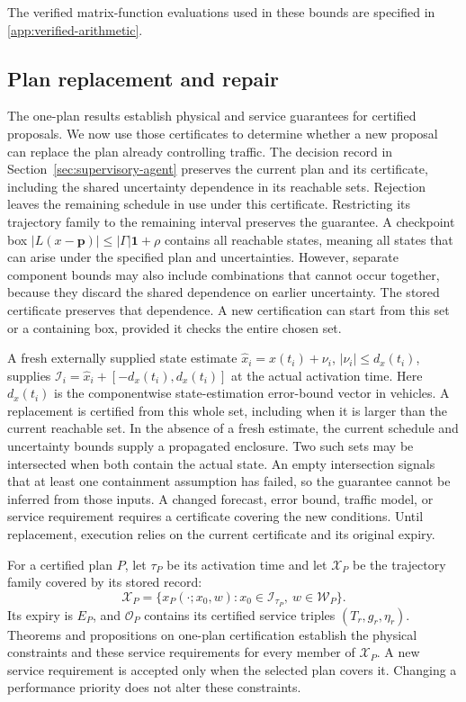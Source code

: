 \documentclass[preprint,12pt]{elsarticle}
\theoremstyle{definition}
\theoremstyle{plain}
\theoremstyle{definition}
\theoremstyle{plain}
\newcommand{\appref}[1]{\ref{#1}}
\begin{document}
The verified matrix-function evaluations used in these bounds are
specified in \appref{app:verified-arithmetic}.

\subsection{Plan replacement and repair}
\label{sec:new-execution}

The one-plan results establish physical and service guarantees for
certified proposals. We now use
those certificates to determine whether a new proposal can replace the
plan already controlling traffic. The decision record in
Section~\ref{sec:supervisory-agent} preserves the current plan and its
certificate, including the shared uncertainty dependence in its reachable sets.
Rejection leaves the remaining schedule in use under this certificate.
Restricting its trajectory family to the remaining interval preserves
the guarantee. A checkpoint box
$|L(x-\mathbf{p})|\le|\Gamma|\mathbf1+\rho$ contains all reachable states, meaning
all states that can arise under the specified plan and uncertainties.
However, separate component bounds may also include combinations that
cannot occur together, because they discard the shared dependence on
earlier uncertainty. The stored certificate preserves that dependence. A new certification
can start from this set or a containing box, provided it checks the
entire chosen set.

A fresh externally supplied state estimate
$\widehat x_i=x(t_i)+\nu_i$, $|\nu_i|\le d_x(t_i)$, supplies
$\mathcal I_i=\widehat x_i+[-d_x(t_i),d_x(t_i)]$ at the actual activation time.
Here $d_x(t_i)$ is the componentwise state-estimation error-bound vector in vehicles.
A replacement is certified from this whole set, including when it is
larger than the current reachable set. In the absence of a fresh estimate,
the current schedule and uncertainty bounds supply a propagated enclosure.
Two such sets may be intersected when both contain the actual state.
An empty intersection signals that at least one containment assumption
has failed, so the guarantee cannot be inferred from those inputs.
A changed forecast, error bound, traffic model, or service requirement
requires a certificate covering the new conditions. Until replacement,
execution relies on the current certificate and its original expiry.

For a certified plan $P$, let $\tau_P$ be its activation time and
let $\mathcal X_P$ be the trajectory family covered by its stored record:
\begin{equation}
\mathcal X_P=\{x_P(\cdot;x_0,w):
 x_0\in\mathcal I_{\tau_P},\ w\in\mathcal W_P\}.
\label{eq:execution-covered-family}
\end{equation}
Its expiry is $E_P$, and $\mathcal O_P$ contains its certified service
triples $(T_r,g_r,\eta_r)$. Theorems and propositions on one-plan
certification establish the physical constraints and these service requirements for every
member of $\mathcal X_P$. A new service requirement is accepted only when the selected plan
covers it. Changing a performance priority does not alter these constraints.
\end{document}
